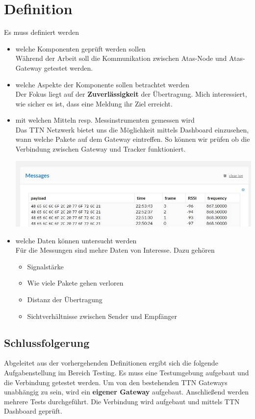 \documentclass[11pt,english,german]{report}
\theoremstyle{definition}
\begin{document}
\section{Definition}
Es muss definiert werden
\begin{itemize}
	\item welche Komponenten geprüft werden sollen\\[0.3cm]
	Während der Arbeit soll die Kommunikation zwischen Atas-Node und Atas-Gateway getestet werden.
	\item welche Aspekte der Komponente sollen betrachtet werden\\[0.3cm]
	Der Fokus liegt auf der \textbf{Zuverlässigkeit} der Übertragung. Mich interessiert, wie sicher es ist, dass eine Meldung ihr Ziel erreicht. 
	\item mit welchen Mitteln resp. Messinstrumenten gemessen wird\\[0.3cm]
	Das TTN Netzwerk bietet uns die Möglichkeit mittels Dashboard einzusehen, wann welche Pakete auf dem Gateway eintreffen. So können wir prüfen ob die Verbindung zwischen Gateway und Tracker funktioniert.\bigskip
	
	\begin{minipage}{\linewidth}
		\centering
		\includegraphics[width=\linewidth]{img/ttn_messages}
	\end{minipage}
	
	\item welche Daten können untersucht werden\\[0.3cm]
	Für die Messungen sind mehre Daten von Interesse. Dazu gehören 
	\begin{itemize}
		\item Signalstärke
		\item Wie viele Pakete gehen verloren
		\item Distanz der Übertragung
		\item Sichtverhältnisse zwischen Sender und Empfänger
	\end{itemize}
\end{itemize}

\subsection{Schlussfolgerung}
Abgeleitet aus der vorhergehenden Definitionen ergibt sich die folgende Aufgabenstellung im Bereich Testing. Es muss eine Testumgebung aufgebaut und die Verbindung getestet werden. Um von den bestehenden TTN Gateways unabhängig zu sein, wird ein \textbf{eigener Gateway} aufgebaut. Anschließend werden mehrere Tests durchgeführt. Die Verbindung wird aufgebaut und mittels TTN Dashboard geprüft.
\end{document}
